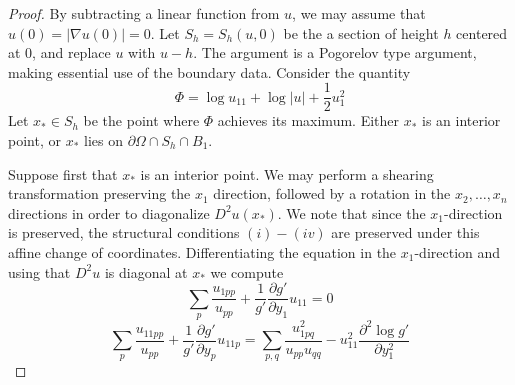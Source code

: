 \documentclass[10pt,a4paper]{amsart}
\newcommand{\del}{\partial}
\numberwithin{equation}{section}
\begin{document}
\setcounter{section}{7}
\setcounter{equation}{0}
\setcounter{claim}{0}
\setcounter{conj}{0}
\setcounter{corr}{0}
\setcounter{defn}{0}
\setcounter{example}{0}
\setcounter{lem}{0}
\setcounter{prop}{1}
\setcounter{ques}{1}
\setcounter{remark}{0}
\setcounter{theorem}{0}
\begin{proof}
    By subtracting a linear function from $u$, we may assume that $u(0)= |\nabla u(0)|=0$.  Let $S_h= S_h(u,0)$ be the a section of height $h$ centered at $0$, and replace $u$ with $u-h$.  The argument is a Pogorelov type argument, making essential use of the boundary data.  Consider the quantity
\[
\Phi = \log u_{11} + \log|u| + \frac{1}{2}u_1^2
\]
    Let $x_* \in S_h$ be the point where $\Phi$ achieves its maximum.  Either $x_*$ is an interior point, or $x_*$ lies on $\del\Omega \cap S_h\cap B_1$. 

Suppose first that $x_*$ is an interior point. We may perform a shearing transformation preserving the $x_1$ direction, followed by a rotation in the $x_2,\ldots,x_n$ directions in order to diagonalize $D^2u(x_*)$.  We note that since the $x_1$-direction is preserved, the structural conditions $(i)-(iv)$ are preserved under this affine change of coordinates. Differentiating the equation in the $x_1$-direction and using that $D^2u$ is diagonal at $x_*$  we compute
\begin{equation}\label{eq: LinearizedEquation}
\sum_p \frac{u_{1pp}}{u_{pp}}  + \frac{1}{g'}\frac{\del g'}{\del y_1}u_{11} = 0
\end{equation}
\begin{equation}\label{eq: concavityEquation}
\sum_p \frac{u_{11pp}}{u_{pp}} + \frac{1}{g'}\frac{\del g'}{\del y_p}u_{11p} = \sum_{p,q}\frac{u_{1pq}^2} {u_{pp}u_{qq}}-u_{11}^2\frac{\del^2 \log g'}{\del y_1^2}
\end{equation}


\end{proof}
\end{document}
